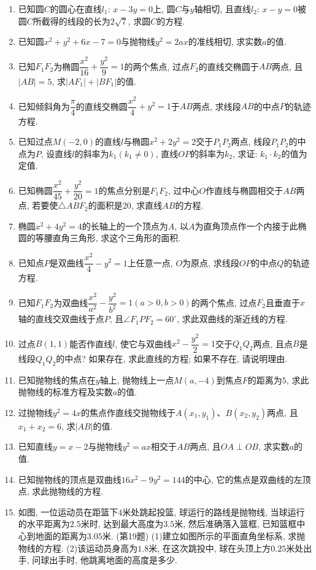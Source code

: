 \documentclass[10pt,a4paper]{article}
\begin{document}
\begin{enumerate}[1.]
\item 已知圆$C$的圆心在直线$l_1$: $x-3y=0$上, 圆$C$与$y$轴相切, 且直线$l_2$: $x-y=0$被圆$C$所截得的线段的长为$2\sqrt 7$, 求圆$C$的方程.
\item 已知圆$x^2+y^2+6x-7=0$与抛物线$y^2=2ax$的准线相切, 求实数$a$的值.
\item 已知$F_1F_2$为椭圆$\dfrac{x^2}{16}+\dfrac{y^2}9=1$的两个焦点, 过点$F_2$的直线交椭圆于$AB$两点, 且$|AB|=5$, 求$|AF_1|+|BF_1|$的值.
\item 已知倾斜角为$\dfrac{\pi }4$的直线交椭圆$\dfrac{x^2}4+y^2=1$于$AB$两点, 求线段$AB$的中点$P$的轨迹方程.
\item 已知过点$M(-2,0)$的直线$l$与椭圆$x^2+2y^2=2$交于$P_1P_2$两点, 线段$P_1P_2$的中点为$P$, 设直线$l$的斜率为$k_1(k_1\ne 0)$, 直线$OP$的斜率为$k_2$, 求证: $k_1\cdot k_2$的值为定值.
\item 已知椭圆$\dfrac{x^2}{45}+\dfrac{y^2}{20}=1$的焦点分别是$F_1F_2$, 过中心$O$作直线与椭圆相交于$AB$两点, 若要使$\triangle ABF_2$的面积是$20$, 求直线$AB$的方程.
\item 椭圆$x^2+4y^2=4$的长轴上的一个顶点为$A$, 以$A$为直角顶点作一个内接于此椭圆的等腰直角三角形, 求这个三角形的面积.
\item 已知点$P$是双曲线$\dfrac{x^2}4-y^2=1$上任意一点, $O$为原点, 求线段$OP$的中点$Q$的轨迹方程.
\item 已知$F_1F_2$为双曲线$\dfrac{x^2}{a^2}-\dfrac{y^2}{b^2}=1(a>0,b>0)$的两个焦点, 过点$F_2$且垂直于$x$轴的直线交双曲线于点$P$, 且$\angle F_1PF_2=60^{\circ }$, 求此双曲线的渐近线的方程.
\item 过点$B(1,1)$能否作直线$l$, 使它与双曲线$x^2-\dfrac{y^2}2=1$交于$Q_1Q_2$两点, 且点$B$是线段$Q_1Q_2$的中点? 如果存在, 求此直线的方程; 如果不存在, 请说明理由.
\item 已知抛物线的焦点在$y$轴上, 抛物线上一点$M(a,-4)$到焦点$F$的距离为$5$, 求此抛物线的标准方程及实数$a$的值.
\item 过抛物线$y^2=4x$的焦点作直线交抛物线于$A(x_1,y_1)$、$B(x_2,y_2)$两点, 且$x_1+x_2=6$, 求$|AB|$的值.
\item 已知直线$y=x-2$与抛物线$y^2=ax$相交于$AB$两点, 且$OA\perp OB$, 求实数$a$的值.
\item 已知抛物线的顶点是双曲线$16x^2-9y^2=144$的中心, 它的焦点是双曲线的左顶点, 求此抛物线的方程.
\item 如图, 一位运动员在距篮下$4$米处跳起投篮, 球运行的路线是抛物线, 当球运行的水平距离为$2.5$米时, 达到最大高度为$3.5$米, 然后准确落入篮框, 已知篮框中心到地面的距离为$3.05$米.
(第19题)
(1)建立如图所示的平面直角坐标系, 求抛物线的方程.
(2)该运动员身高为$1.8$米, 在这次跳投中, 球在头顶上方$0.25$米处出手, 问球出手时, 他跳离地面的高度是多少.

\end{enumerate}
\end{document}
